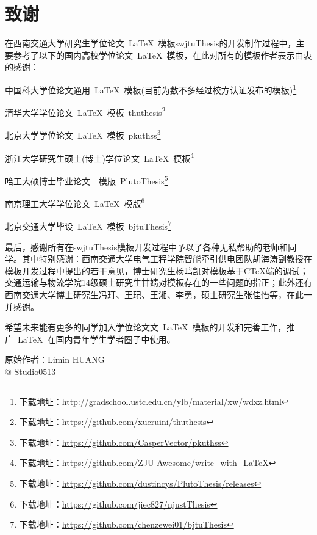 \chapter*{致\qquad{}谢}

在西南交通大学研究生学位论文~\LaTeX{}~模板swjtuThesis的开发制作过程中，主要参考了以下的国内高校学位论文~\LaTeX{}~模板，在此对所有的模板作者表示由衷的感谢：
\begin{compactitem}
	\item 中国科大学位论文通用~\LaTeX{}~模板(目前为数不多经过校方认证发布的模板)\footnote{下载地址：\url{http://gradschool.ustc.edu.cn/ylb/material/xw/wdxz.html}}
	\item 清华大学学位论文~\LaTeX{}~模板~thuthesis\footnote{下载地址：\url{https://github.com/xueruini/thuthesis}}
	\item 北京大学学位论文~\LaTeX{}~模板~pkuthss\footnote{下载地址：\url{https://github.com/CasperVector/pkuthss}}
	\item 浙江大学研究生硕士(博士)学位论文~\LaTeX{}~模板\footnote{下载地址：\url{https://github.com/ZJU-Awesome/write_with_LaTeX}}
	\item 哈工大硕博士毕业论文~\XeLaTeX{}~模版~PlutoThesis\footnote{下载地址：\url{https://github.com/dustincys/PlutoThesis/releases}}
	\item 南京理工大学学位论文~\LaTeX{}~模版\footnote{下载地址：\url{https://github.com/jiec827/njustThesis}}
	\item 北京交通大学毕设~\LaTeX{}~模板~bjtuThesis\footnote{下载地址：\url{https://github.com/chenzewei01/bjtuThesis}}
\end{compactitem}

\par
最后，感谢所有在swjtuThesis模板开发过程中予以了各种无私帮助的老师和同学。其中特别感谢：西南交通大学电气工程学院智能牵引供电团队胡海涛副教授在模板开发过程中提出的若干意见，博士研究生杨鸣凯对模板基于CTeX端的调试；交通运输与物流学院14级硕士研究生甘婧对模板存在的一些问题的指正；此外还有西南交通大学博士研究生冯玎、王玘、王湘、李勇，硕士研究生张佳怡等，在此一并感谢。

\par
希望未来能有更多的同学加入学位论文文~\LaTeX{}~模板的开发和完善工作，推广~\LaTeX{}~在国内青年学生学者圈子中使用。

\vspace{25mm}
\begin{flushright}
	原始作者：Limin HUANG \\
	@ Studio0513
\end{flushright}
